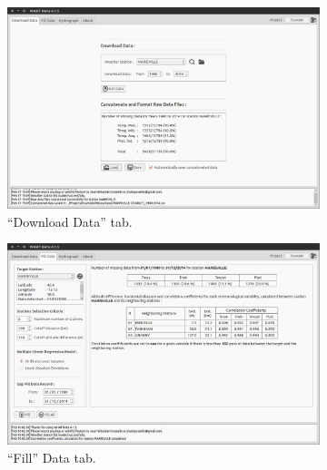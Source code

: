\documentclass[WHATMANUAL.tex]{subfiles}
\begin{document}
\begin{figure}[!ht]
        \centering
        \begin{subfigure}[t]{0.45\textwidth}
                \includegraphics[width=\textwidth]{img/WHAT_Screenshot000}
                \caption{``Download Data'' tab.}
                \label{subfig:ScnShot_000}                
        \end{subfigure}%
        \hspace{0.5cm}
        \begin{subfigure}[t]{0.45\textwidth}
                \includegraphics[width=\textwidth]{img/WHAT_Screenshot001}
                \caption{``Fill'' Data tab.}
                \label{subfig:ScnShot_001}
        \end{subfigure}
        \\[0.5cm]
        \begin{subfigure}[t]{0.45\textwidth}

\end{subfigure}
\end{figure}
\end{document}
